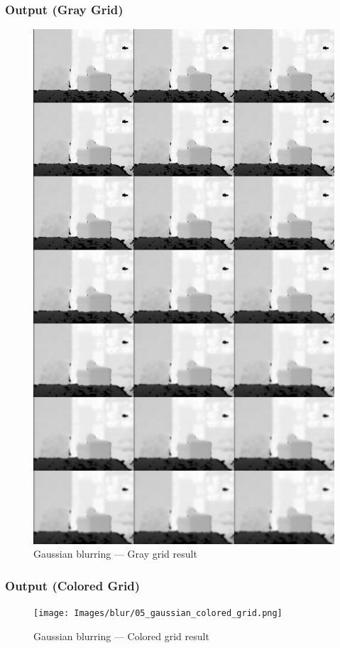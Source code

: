 \documentclass[a4paper,11pt]{article}
\begin{document}
	\subsubsection*{Output (Gray Grid)}
	\begin{figure}[H]
		\centering
		\includegraphics[width=\textwidth,height=0.9\textheight,keepaspectratio]{Images/blur/05_gaussian_gray_grid.png}
		\caption{Gaussian blurring — Gray grid result}
	\end{figure}
	\clearpage
	
	\subsubsection*{Output (Colored Grid)}
	\begin{figure}[H]
		\centering
		\texttt{[image: Images/blur/05\_gaussian\_colored\_grid.png]}
		\caption{Gaussian blurring — Colored grid result}
	\end{figure}
	\clearpage
	
\end{document}
